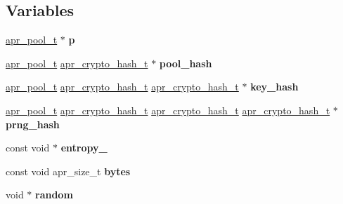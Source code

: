 \subsection*{Variables}
\begin{DoxyCompactItemize}
\item 
\mbox{\label{group__apr__random_ga2e727f881424334cf12d8af10f50ec6c}} 
\mbox{\hyperlink{group__apr__pools_gaf137f28edcf9a086cd6bc36c20d7cdfb}{apr\+\_\+pool\+\_\+t}} $\ast$ {\bfseries p}
\item 
\mbox{\label{group__apr__random_ga467948cb4cf4e6c6531ec82add319f77}} 
\mbox{\hyperlink{group__apr__pools_gaf137f28edcf9a086cd6bc36c20d7cdfb}{apr\+\_\+pool\+\_\+t}} \mbox{\hyperlink{structapr__crypto__hash__t}{apr\+\_\+crypto\+\_\+hash\+\_\+t}} $\ast$ {\bfseries pool\+\_\+hash}
\item 
\mbox{\label{group__apr__random_ga8cfe7466d86884deb41f9260608ef429}} 
\mbox{\hyperlink{group__apr__pools_gaf137f28edcf9a086cd6bc36c20d7cdfb}{apr\+\_\+pool\+\_\+t}} \mbox{\hyperlink{structapr__crypto__hash__t}{apr\+\_\+crypto\+\_\+hash\+\_\+t}} \mbox{\hyperlink{structapr__crypto__hash__t}{apr\+\_\+crypto\+\_\+hash\+\_\+t}} $\ast$ {\bfseries key\+\_\+hash}
\item 
\mbox{\label{group__apr__random_gac92511b46c28b5d66795bde787ad8f84}} 
\mbox{\hyperlink{group__apr__pools_gaf137f28edcf9a086cd6bc36c20d7cdfb}{apr\+\_\+pool\+\_\+t}} \mbox{\hyperlink{structapr__crypto__hash__t}{apr\+\_\+crypto\+\_\+hash\+\_\+t}} \mbox{\hyperlink{structapr__crypto__hash__t}{apr\+\_\+crypto\+\_\+hash\+\_\+t}} \mbox{\hyperlink{structapr__crypto__hash__t}{apr\+\_\+crypto\+\_\+hash\+\_\+t}} $\ast$ {\bfseries prng\+\_\+hash}
\item 
\mbox{\label{group__apr__random_ga0feb49c6530af6eb997e0937caa0f144}} 
const void $\ast$ {\bfseries entropy\+\_\+}
\item 
\mbox{\label{group__apr__random_ga393b167dab644f408202cbbcad070e6d}} 
const void apr\+\_\+size\+\_\+t {\bfseries bytes}
\item 
\mbox{\label{group__apr__random_gaf9af9a235f7919252e3d3ace127a6aeb}} 
void $\ast$ {\bfseries random}
\end{DoxyCompactItemize}


